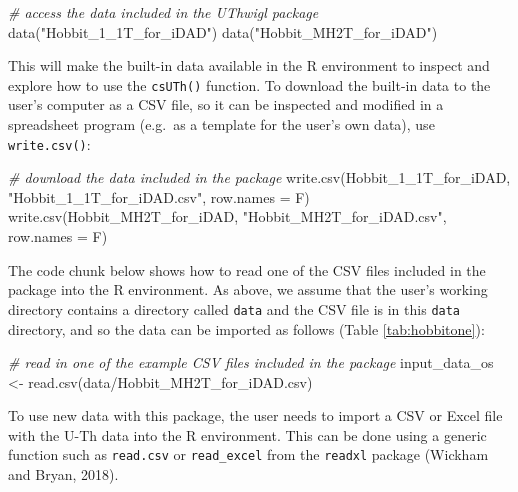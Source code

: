 \documentclass[]{elsarticle} %
\newenvironment{Shaded}{\begin{snugshade}}{\end{snugshade}}
\newcommand{\AttributeTok}[1]{\textcolor[rgb]{0.77,0.63,0.00}{#1}}
\newcommand{\CommentTok}[1]{\textcolor[rgb]{0.56,0.35,0.01}{\textit{#1}}}
\newcommand{\FunctionTok}[1]{\textcolor[rgb]{0.00,0.00,0.00}{#1}}
\newcommand{\NormalTok}[1]{#1}
\newcommand{\OtherTok}[1]{\textcolor[rgb]{0.56,0.35,0.01}{#1}}
\newcommand{\StringTok}[1]{\textcolor[rgb]{0.31,0.60,0.02}{#1}}
\begin{document}
\begin{Shaded}
\begin{Highlighting}[]
\CommentTok{\# access the data included in the UThwigl package}
\FunctionTok{data}\NormalTok{(}\StringTok{"Hobbit\_1\_1T\_for\_iDAD"}\NormalTok{)}
\FunctionTok{data}\NormalTok{(}\StringTok{"Hobbit\_MH2T\_for\_iDAD"}\NormalTok{)}
\end{Highlighting}
\end{Shaded}

This will make the built-in data available in the R environment to inspect and explore how to use the \texttt{csUTh()} function.
To download the built-in data to the user's computer as a CSV file, so it can be inspected and modified in a spreadsheet program (e.g.~as a template for the user's own data), use \texttt{write.csv()}:

\begin{Shaded}
\begin{Highlighting}[]
\CommentTok{\# download the data included in the package}
\FunctionTok{write.csv}\NormalTok{(Hobbit\_1\_1T\_for\_iDAD, }\StringTok{"Hobbit\_1\_1T\_for\_iDAD.csv"}\NormalTok{, }\AttributeTok{row.names =}\NormalTok{ F)}
\FunctionTok{write.csv}\NormalTok{(Hobbit\_MH2T\_for\_iDAD, }\StringTok{"Hobbit\_MH2T\_for\_iDAD.csv"}\NormalTok{, }\AttributeTok{row.names =}\NormalTok{ F)}
\end{Highlighting}
\end{Shaded}

The code chunk below shows how to read one of the CSV files included in the package into the R environment. As above, we assume that the user's working directory contains a directory called \texttt{data} and the CSV file is in this \texttt{data} directory, and so the data can be imported as follows (Table \ref{tab:hobbitone}):

\begin{Shaded}
\begin{Highlighting}[]
\CommentTok{\# read in one of the example CSV files included in the package}
\NormalTok{input\_data\_os }\OtherTok{\textless{}{-}}
  \FunctionTok{read.csv}\NormalTok{(}\StringTok{\textquotesingle{}data/Hobbit\_MH2T\_for\_iDAD.csv\textquotesingle{}}\NormalTok{)}
\end{Highlighting}
\end{Shaded}

To use new data with this package, the user needs to import a CSV or Excel file with the U-Th data into the R environment. This can be done using a generic function such as \texttt{read.csv} or \texttt{read\_excel} from the \texttt{readxl} package (Wickham and Bryan, 2018).
\end{document}
